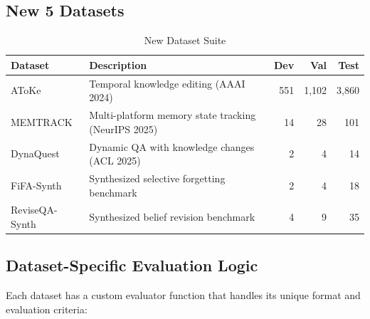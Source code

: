 \documentclass[11pt,a4paper]{article}
\begin{document}
\subsection{New 5 Datasets}

\begin{table}[H]
\centering
\caption{New Dataset Suite}
\small
\begin{tabular}{@{}lp{5cm}rrr@{}}
\toprule
\textbf{Dataset} & \textbf{Description} & \textbf{Dev} & \textbf{Val} & \textbf{Test} \\
\midrule
AToKe & Temporal knowledge editing (AAAI 2024) & 551 & 1,102 & 3,860 \\
MEMTRACK & Multi-platform memory state tracking (NeurIPS 2025) & 14 & 28 & 101 \\
DynaQuest & Dynamic QA with knowledge changes (ACL 2025) & 2 & 4 & 14 \\
FiFA-Synth & Synthesized selective forgetting benchmark & 2 & 4 & 18 \\
ReviseQA-Synth & Synthesized belief revision benchmark & 4 & 9 & 35 \\
\bottomrule
\end{tabular}
\end{table}

\subsection{Dataset-Specific Evaluation Logic}

Each dataset has a custom evaluator function that handles its unique format and evaluation criteria:
\end{document}
